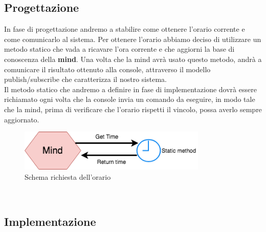 \documentclass{llncs}
\begin{document}
\subsection{Progettazione}
\label{ProgettazioneReq3}
In fase di progettazione andremo a stabilire come ottenere l'orario corrente e come comunicarlo al sistema. Per ottenere l'orario abbiamo deciso di utilizzare un metodo statico che vada a ricavare l'ora corrente e che aggiorni la base di conoscenza della \textbf{mind}. Una volta che la mind avr\`a usato questo metodo, andr\`a a comunicare il risultato ottenuto alla console, attraverso il modello publish/subscribe che caratterizza il nostro sistema.\\
Il metodo statico che andremo a definire in fase di implementazione dovr\`a essere richiamato ogni volta che la console invia un comando da eseguire, in modo tale che la mind, prima di verificare che l'orario rispetti il vincolo, possa averlo sempre aggiornato. \\
\begin{figure}
    \centering
    \includegraphics[width=0.8\textwidth]{Immagini/Requisito3/MindReq3.png}
    \caption{Schema richiesta dell'orario}
    \label{fig:TestReq3}
\end{figure}
\vspace*{1ex}
\\

\subsection{Implementazione}
\label{ImplementazioneReq3}
\end{document}
